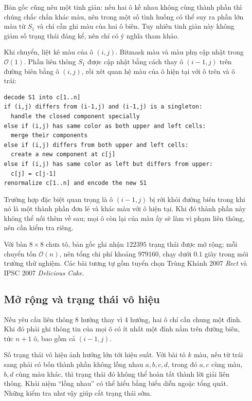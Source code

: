 \documentclass[11pt]{article}
\newcommand{\Oh}{\mathcal{O}}
\begin{document}
Bản gốc cũng nêu một tinh giản: nếu hai ô kề nhau không cùng thành phần thì
chúng chắc chắn khác màu, nên trong một số tình huống có thể suy ra phần lớn
màu từ \(S_1\) và chỉ cần ghi màu của hai ô biên. Tuy nhiên tinh giản này không
giảm số trạng thái đáng kể, nên chỉ có ý nghĩa tham khảo.

Khi chuyển, liệt kê màu của ô \((i,j)\). Bitmask màu và màu phụ cập nhật trong
\(\Oh(1)\). Phần liên thông \(S_1\) được cập nhật bằng cách thay ô
\((i-1,j)\) trên đường biên bằng ô \((i,j)\), rồi xét quan hệ màu của ô hiện
tại với ô trên và ô trái:
\begin{verbatim}
decode S1 into c[1..n]
if (i,j) differs from (i-1,j) and (i-1,j) is a singleton:
  handle the closed component specially
else if (i,j) has same color as both upper and left cells:
  merge their components
else if (i,j) differs from both upper and left cells:
  create a new component at c[j]
else if (i,j) has same color as left but differs from upper:
  c[j] = c[j-1]
renormalize c[1..n] and encode the new S1
\end{verbatim}

Trường hợp đặc biệt quan trọng là ô \((i-1,j)\) bị rời khỏi đường biên trong
khi nó là một thành phần đơn lẻ và khác màu với ô hiện tại. Khi đó thành phần
này không thể nối thêm về sau; mọi ô còn lại của màu ấy sẽ làm vi phạm liên
thông, nên cần kiểm tra riêng.

Với bàn \(8\times8\) chưa tô, bản gốc ghi nhận \(122395\) trạng thái được mở
rộng; mỗi chuyển tốn \(\Oh(n)\), nên tổng chi phí khoảng \(979160\), chạy dưới
\(0.1\) giây trong môi trường thử nghiệm. Các bài tương tự gồm tuyển chọn
Trùng Khánh 2007 \textit{Rect} và IPSC 2007 \textit{Delicious Cake}.

\subsection{Mở rộng và trạng thái vô hiệu}

Nếu yêu cầu liên thông 8 hướng thay vì 4 hướng, hai ô chỉ cần chung một đỉnh.
Khi đó phải ghi thông tin của mọi ô có ít nhất một đỉnh nằm trên đường biên,
tức \(n+1\) ô, bao gồm cả \((i-1,j)\).

Số trạng thái vô hiệu ảnh hưởng lớn tới hiệu suất. Với bài tô \(k\) màu, nếu
từ trái sang phải có bốn thành phần không lồng nhau \(a,b,c,d\), trong đó
\(a,c\) cùng màu, \(b,d\) cùng màu khác, thì trạng thái đó không thể hoàn tất
thành lời giải liên thông. Khái niệm ``lồng nhau'' có thể hiểu bằng biểu diễn
ngoặc tổng quát. Những kiểm tra như vậy giúp cắt trạng thái sớm.
\end{document}
